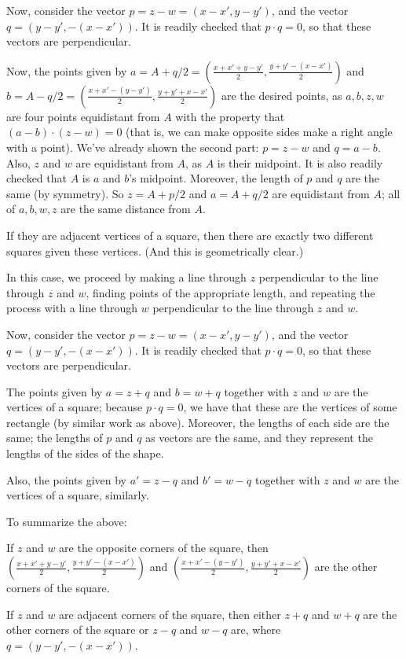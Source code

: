 \documentclass[a4paper,12pt]{article}
\begin{document}
\tab Now, consider the vector $p=z-w = (x-x',y-y')$, and the vector $q = (y-y',-(x-x'))$. It is readily checked that $p \cdot q=0$, so that these vectors are perpendicular.

\tab Now, the points given by $a=A+ q/2 = (\frac{x+x'+y-y'}{2},\frac{y+y'-(x-x')}{2})$ and $b=A - q/2 = (\frac{x+x'-(y-y')}{2},\frac{y+y'+x-x'}{2})$ are the desired points, as $a,b,z,w$ are four points equidistant from $A$ with the property that $(a-b) \cdot (z-w) = 0$ (that is, we can make opposite sides make a right angle with a point). We've already shown the second part: $p=z-w$ and $q=a-b$. Also, $z$ and $w$ are equidistant from $A$, as $A$ is their midpoint. It is also readily checked that $A$ is $a$ and $b$'s midpoint. Moreover, the length of $p$ and $q$ are the same (by symmetry). So $z= A + p/2$ and $a = A+q/2$ are equidistant from $A$; all of $a,b,w,z$ are the same distance from $A$.

If they are adjacent vertices of a square, then there are exactly two different squares given these vertices. (And this is geometrically clear.)

\tab In this case, we proceed by making a line through $z$ perpendicular to the line through $z$ and $w$, finding points of the appropriate length, and repeating the process with a line through $w$ perpendicular to the line through $z$ and $w$.

\tab Now, consider the vector $p=z-w = (x-x',y-y')$, and the vector $q = (y-y',-(x-x'))$. It is readily checked that $p \cdot q=0$, so that these vectors are perpendicular.

\tab The points given by $a=z+q$ and $b=w+q$ together with $z$ and $w$ are the vertices of a square; because $p \cdot q = 0$, we have that these are the vertices of some rectangle (by similar work as above). Moreover, the lengths of each side are the same; the lengths of $p$ and $q$ as vectors are the same, and they represent the lengths of the sides of the shape.

\tab Also, the points given by $a'=z-q$ and $b'=w-q$ together with $z$ and $w$ are the vertices of a square, similarly.

To summarize the above:

\tab If $z$ and $w$ are the opposite corners of the square, then $(\frac{x+x'+y-y'}{2},\frac{y+y'-(x-x')}{2})$ and $(\frac{x+x'-(y-y')}{2},\frac{y+y'+x-x'}{2})$ are the other corners of the square.

\tab If $z$ and $w$ are adjacent corners of the square, then either $z+q$ and $w+q$ are the other corners of the square or $z-q$ and $w-q$ are, where $q = (y-y',-(x-x'))$.
\end{document}
